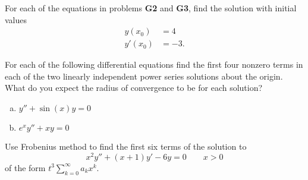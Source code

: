 \documentclass[12pt,letterpaper]{hmcpset}
\begin{document}
\begin{problem}[G4]
    For each of the equations in problems \textbf{G2} and \textbf{G3}, find the solution with initial values
    \begin{align*}
        y(x_0) &= 4\\
        y'(x_0) &= -3.
    \end{align*}
\end{problem}

\begin{solution}
    \vfill
\end{solution}
\clearpage

\begin{problem}[G5]
    For each of the following differential equations find the first four nonzero terms in each of
    the two linearly independent power series solutions about the origin. What do you expect
    the radius of convergence to be for each solution?
    \begin{enumerate}[(a)]
        \item $y'' + \sin(x)y = 0$
        \item $e^xy'' + xy = 0$
    \end{enumerate}
\end{problem}

\begin{solution}
    \vfill
\end{solution}
\clearpage

\begin{problem}[G6]
    Use Frobenius method to find the first six terms of the solution to
    \[
        x^2y'' + (x+1)y' - 6y = 0 \qquad x > 0
    \]
    of the form $t^3\sum_{k=0}^\infty a_kx^k$.
\end{problem}

\begin{solution}
    \vfill
\end{solution}
\clearpage
\end{document}
